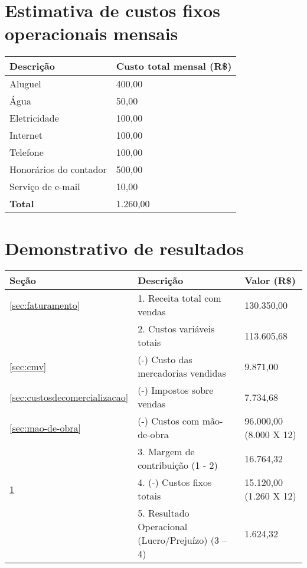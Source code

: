 \section{Estimativa de custos fixos operacionais mensais}\label{sec:custosfixos}

\begin{tabular}{| l | l |}
  \hline
  \textbf{Descrição} & \textbf{Custo total mensal (R\$)} \\ \hline
  Aluguel & 400,00 \\ \hline
  Água & 50,00 \\ \hline
  Eletricidade & 100,00 \\ \hline
  Internet & 100,00 \\ \hline
  Telefone & 100,00 \\ \hline
  Honorários do contador & 500,00 \\ \hline
  Serviço de e-mail & 10,00 \\ \hline
  \textbf{Total} & 1.260,00 \\ \hline
\end{tabular}

\section{Demonstrativo de resultados}
  
\begin{tabular}{| l | l | l |}
  \hline
  \textbf{Seção} & \textbf{Descrição} & \textbf{Valor (R\$)}\\ \hline
  \ref{sec:faturamento} & 1. Receita total com vendas & 130.350,00\\ \hline \hline
   & 2. Custos variáveis totais & 113.605,68\\ \hline
  \ref{sec:cmv} & (-) Custo das mercadorias vendidas & 9.871,00\\ \hline
  \ref{sec:custosdecomercializacao} & (-) Impostos sobre vendas & 7.734,68\\ \hline
  \ref{sec:mao-de-obra} & (-) Custos com mão-de-obra & 96.000,00 (8.000 X 12)\\ \hline \hline
   & 3. Margem de contribuição (1 - 2) & 16.764,32\\ \hline \hline
  \ref{sec:custosfixos} & 4. (-) Custos fixos totais & 15.120,00 (1.260 X 12)\\ \hline \hline 
   & 5. Resultado Operacional (Lucro/Prejuízo) (3 – 4) & 1.624,32\\ \hline
\end{tabular}

